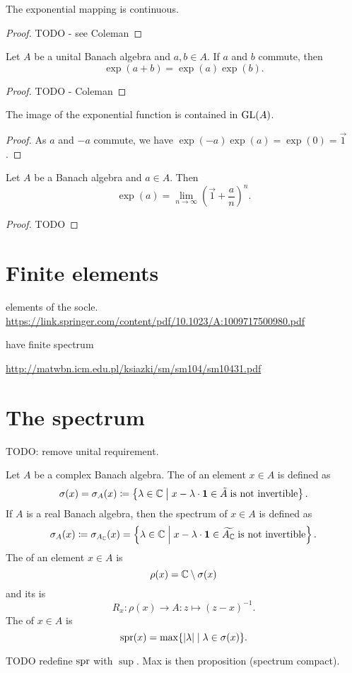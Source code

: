 \begin{lemma} \label{continuityExp}
The exponential mapping is continuous.
\end{lemma}
\begin{proof}
TODO - see Coleman
\end{proof}

\begin{proposition}
Let $A$ be a unital Banach algebra and $a,b\in A$. If $a$ and $b$ commute, then
\[ \exp(a+b) = \exp(a)\exp(b). \]
\end{proposition}
\begin{proof}
TODO - Coleman
\end{proof}
\begin{corollary}
The image of the exponential function is contained in $\operatorname{GL}(A)$.
\end{corollary}
\begin{proof}
As $a$ and $-a$ commute, we have $\exp(-a)\exp(a) = \exp(0) = \vec{1}$.
\end{proof}

\begin{lemma}
Let $A$ be a Banach algebra and $a\in A$. Then
\[ \exp(a) = \lim_{n\to\infty} \left(\vec{1} + \frac{a}{n}\right)^n. \]
\end{lemma}
\begin{proof}
TODO
\end{proof}

\section{Finite elements}
elements of the socle. \url{https://link.springer.com/content/pdf/10.1023/A:1009717500980.pdf}

have finite spectrum 

\url{http://matwbn.icm.edu.pl/ksiazki/sm/sm104/sm10431.pdf}

\section{The spectrum}
TODO: remove unital requirement.
\begin{definition}
Let $A$ be a complex Banach algebra. The  of an element $x\in A$ is defined as
\[ \sigma(x) = \sigma_A(x) \coloneqq \left\{ \lambda\in\mathbb{C} \;\middle|\; x-\lambda\cdot \boldsymbol{\mathrm{1}} \in \tilde{A} \;\text{is not invertible} \right\}. \]
If $A$ is a real Banach algebra, then the spectrum of $x\in A$ is defined as
\[ \sigma_A(x) \coloneqq \sigma_{A_{\mathbb{C}}}(x) = \left\{ \lambda\in\mathbb{C} \;\middle|\; x-\lambda\cdot \boldsymbol{\mathrm{1}} \in \widetilde{A_{\mathbb{C}}} \;\text{is not invertible} \right\}.  \]
The  of an element $x\in A$ is
\[ \rho(x) = \mathbb{C}\setminus\sigma(x) \]
and its  is
\[ R_x: \rho(x) \to A : z\mapsto (z-x)^{-1}. \]
The  of $x\in A$ is
\[ \operatorname{spr}(x) = \max\{ |\lambda|\;|\; \lambda\in\sigma(x) \}. \]
\end{definition}
TODO redefine $\operatorname{spr}$ with $\sup$. Max is then proposition (spectrum compact).

